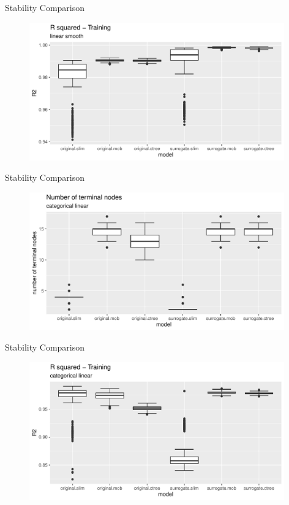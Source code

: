 \documentclass[9pt, xcolor=table]{beamer}
\begin{document}
\begin{frame}{Stability Comparison}
\begin{figure}
    \includegraphics[width=11cm]{Figures/Stability/linear_smooth/r2_train.pdf}
\end{figure}
\end{frame}

\begin{frame}{Stability Comparison}
\begin{figure}
    \includegraphics[width=11cm]{Figures/Stability/categorical_linear/nofnodes.pdf}
\end{figure}
\end{frame}

\begin{frame}{Stability Comparison}
\begin{figure}
    \includegraphics[width=11cm]{Figures/Stability/categorical_linear/r2_train.pdf}
\end{figure}
\end{frame}
\end{document}
